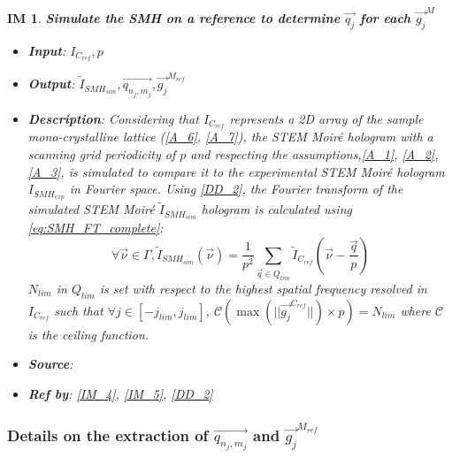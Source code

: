 \documentclass[12pt]{article}
\newtheorem{IM}{IM}
\begin{document}
\renewcommand{\labelitemi}{$-$}

\begin{IM}
\label{IM_1}
\noindent\colorbox{shadecolorIM}{\normalfont \textbf{Simulate the SMH on a reference to determine $\overrightarrow{q_{j}}$ for each $\overrightarrow{g_j}^{M}$}}
\normalfont
\begin{itemize}
\item \textbf{Input}: $I_{C_{ref}}, p$
\item \textbf{Output}: $\widetilde{I}_{SMH_{sim}}, \overrightarrow{q_{n_j,m_j}}, \overrightarrow{g_j}^{M_{ref}}$
\item \textbf{Description}: Considering that $I_{C_{ref}}$ represents a 2D array of the sample mono-crystalline lattice (\cref{A_6}, \cref{A_7}), the STEM Moir{\'e} hologram with a scanning grid periodicity of $p$ and respecting the assumptions,\cref{A_1}, \cref{A_2}, \cref{A_3}, is simulated to compare it to the experimental STEM Moir{\'e} hologram $I_{SMH_{exp}}$ in Fourier space. Using \cref{DD_2}, the Fourier transform of the simulated STEM Moir{\'e} $\widetilde{I}_{SMH_{sim}}$ hologram is calculated using \cref{eq:SMH_FT_complete}:
\begin{equation}
\forall \vec{\nu} \in \Gamma, \widetilde{I}_{SMH_{sim}}(\vec{\nu})=\frac{1}{p^2}\sum_{\vec{q}\in Q_{lim}}\widetilde{I}_{C_{ref}}(\vec{\nu}-\frac{\vec{q}}{p})
\end{equation}
$N_{lim}$ in $Q_{lim}$ is set with respect to the highest spatial frequency resolved in  $I_{C_{ref}}$ such that $\forall j \in [-j_{lim},j_{lim}], \ \mathcal{C}(\max(||\overrightarrow{g_j}^{C_{ref}}||)\times p) = N_{lim}$ where $\mathcal{C}$ is the ceiling function.
\item \textbf{Source}: \cite{Pofelski2017}
\item \textbf{Ref by}: \cref{IM_4}, \cref{IM_5}, \cref{DD_2}
\end{itemize}
\end{IM}

\subsubsection*{Details on the extraction of $\overrightarrow{q_{n_j,m_j}}$ and $ \overrightarrow{g_j}^{M_{ref}}$}
\end{document}
